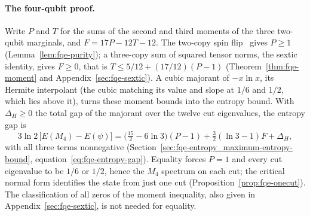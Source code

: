 \documentclass[11pt]{article}
\begin{document}
\paragraph{The four-qubit proof.} Write $P$ and $T$ for the sums of the second and third
moments of the three two-qubit marginals, and $F=17P-12T-12$. The two-copy spin flip~\cite{GW,WC} gives $P\ge1$
(Lemma~\ref{lem:fqe-purity}); a three-copy sum of squared tensor norms, the sextic identity, gives
$F\ge0$, that is $T\le5/12+(17/12)(P-1)$ (Theorem~\ref{thm:fqe-moment} and Appendix~\ref{sec:fqe-sextic}).
A cubic majorant of $-x\ln x$, its Hermite interpolant (the cubic matching its value and slope at $1/6$ and $1/2$,
which lies above it), turns these
moment bounds into the entropy bound. With $\Delta_H\ge0$ the total gap of the majorant over the twelve cut eigenvalues,
the entropy gap is
\[
3\ln2\,\bigl[E(M_4)-E(\psi)\bigr]=\bigl(\tfrac{15}{2}-6\ln3\bigr)(P-1)+\tfrac32(\ln3-1)F+\Delta_H,
\]
with all three terms nonnegative (Section~\ref{sec:fqe-entropy_maximum-entropy-bound},
equation~\eqref{eq:fqe-entropy-gap}). Equality forces $P=1$ and every cut eigenvalue to be $1/6$ or $1/2$, hence the $M_4$ spectrum
on each cut; the critical normal form identifies the state from just one cut
(Proposition~\ref{prop:fqe-onecut}). The classification of all zeros of the
moment inequality, also given in Appendix~\ref{sec:fqe-sextic}, is not needed for equality.
\end{document}
